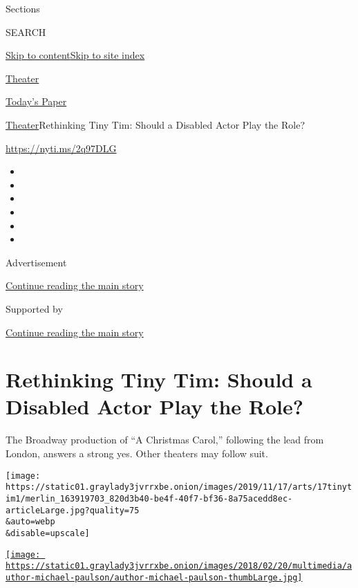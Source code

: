 Sections

SEARCH

\protect\hyperlink{site-content}{Skip to
content}\protect\hyperlink{site-index}{Skip to site index}

\href{https://www.nytimes3xbfgragh.onion/section/theater}{Theater}

\href{https://myaccount.nytimes3xbfgragh.onion/auth/login?response_type=cookie\&client_id=vi}{}

\href{https://www.nytimes3xbfgragh.onion/section/todayspaper}{Today's
Paper}

\href{/section/theater}{Theater}\textbar{}Rethinking Tiny Tim: Should a
Disabled Actor Play the Role?

\url{https://nyti.ms/2q97DLG}

\begin{itemize}
\item
\item
\item
\item
\item
\item
\end{itemize}

Advertisement

\protect\hyperlink{after-top}{Continue reading the main story}

Supported by

\protect\hyperlink{after-sponsor}{Continue reading the main story}

\hypertarget{rethinking-tiny-tim-should-a-disabled-actor-play-the-role}{%
\section{Rethinking Tiny Tim: Should a Disabled Actor Play the
Role?}\label{rethinking-tiny-tim-should-a-disabled-actor-play-the-role}}

The Broadway production of ``A Christmas Carol,'' following the lead
from London, answers a strong yes. Other theaters may follow suit.

\texttt{[image: https://static01.graylady3jvrrxbe.onion/images/2019/11/17/arts/17tinytim1/merlin\_163919703\_820d3b40-be4f-40f7-bf36-8a75acedd8ec-articleLarge.jpg?quality=75\\\&auto=webp\\\&disable=upscale]}

\href{https://www.nytimes3xbfgragh.onion/by/michael-paulson}{\texttt{[image: https://static01.graylady3jvrrxbe.onion/images/2018/02/20/multimedia/author-michael-paulson/author-michael-paulson-thumbLarge.jpg]}}

